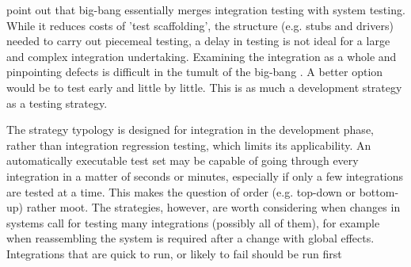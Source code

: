 \documentclass[12pt,a4paper,oneside,pdftex]{report}
\begin{document}
\citet{pezze2008software} point out that big-bang essentially merges integration testing with system testing. While it reduces costs of 'test scaffolding', the structure (e.g. stubs and drivers) needed to carry out piecemeal testing, a delay in testing is not ideal for a large and complex integration undertaking. Examining the integration as a whole and pinpointing defects is difficult in the tumult of the big-bang \citep{myers1976software, pezze2008software}. A better option would be to test early and little by little. This is as much a development strategy as a testing strategy.

The strategy typology is designed for integration in the development phase, rather than integration regression testing, which limits its applicability. An automatically executable test set may be capable of going through every integration in a matter of seconds or minutes, especially if only a few integrations are tested at a time. This makes the question of order (e.g. top-down or bottom-up) rather moot. The strategies, however, are worth considering when changes in systems call for testing many integrations (possibly all of them), for example when reassembling the system is required after a change with global effects. Integrations that are quick to run, or likely to fail should be run first \citep{duvall2007continuous} 

%
%
%
%
\end{document}
